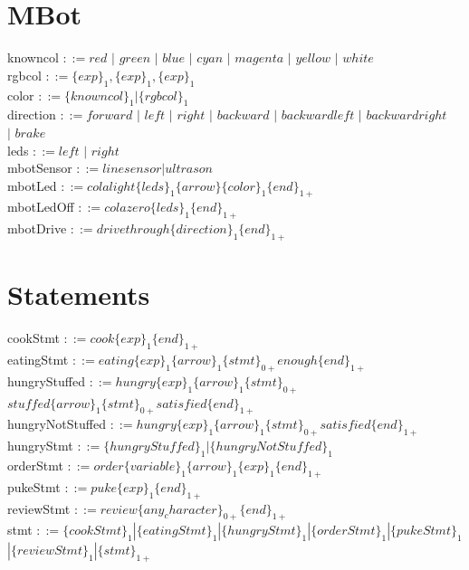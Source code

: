 \documentclass[12pt,a4paper]{report}
\begin{document}
\section{MBot}
knowncol $::= red$ $|$ $green$ $|$ $blue$ $|$ $cyan$ $|$ $magenta$ $|$ $yellow$ $|$ $white$\\
rgbcol $::= \{exp\}_{1}, \{exp\}_{1}, \{exp\}_{1}$\\
color $::= \{knowncol\}_{1} | \{rgbcol\}_{1}$\\
direction $::= forward$ $|$ $left$ $|$ $right$ $|$ $backward$ $|$ $backwardleft$ $|$ $backwardright$ \\
\indent\indent\indent$|$ $brake$\\
leds $::= left$ $|$ $right$\\
mbotSensor $::= linesensor | ultrason$\\
mbotLed $::= colalight \{leds\}_{1} \{arrow\} \{color\}_{1} \{end\}_{1+}$\\
mbotLedOff $::= colazero \{leds\}_{1} \{end\}_{1+}$\\
mbotDrive $::= drivethrough \{direction\}_{1} \{end\}_{1+}$\\

\section{Statements}
cookStmt $::= cook \{exp\}_{1} \{end\}_{1+}$\\
eatingStmt $::= eating \{exp\}_{1} \{arrow\}_{1} \{stmt\}_{0+} enough \{end\}_{1+}$\\
hungryStuffed $::= hungry \{exp\}_{1} \{arrow\}_{1} \{stmt\}_{0+}$\\
\indent\indent\indent\indent $stuffed \{arrow\}_{1} \{stmt\}_{0+} satisfied \{end\}_{1+}$\\
hungryNotStuffed $::= hungry \{exp\}_{1} \{arrow\}_{1} \{stmt\}_{0+} satisfied \{end\}_{1+}$\\
hungryStmt $::= \{hungryStuffed\}_{1} | \{hungryNotStuffed\}_{1}$\\
orderStmt $::= order \{variable\}_{1} \{arrow\}_{1} \{exp\}_{1} \{end\}_{1+}$\\
pukeStmt $::= puke \{exp\}_{1} \{end\}_{1+}$\\
reviewStmt $::= review \{any_character\}_{0+} \{end\}_{1+}$\\
stmt $::= \{cookStmt\}_{1} | \{eatingStmt\}_{1} | \{hungryStmt\}_{1} | \{orderStmt\}_{1} | \{pukeStmt\}_{1}$\\
\indent\indent$| \{reviewStmt\}_{1} | \{stmt\}_{1+}$\\
\end{document}
